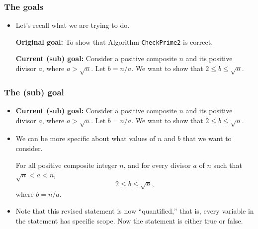 \begin{frame}\frametitle{The goals}
  \begin{itemize}
  \item Let's recall what we are trying to do.

    \begin{tcolorbox}
      {\bf Original goal:} To show that Algorithm {\tt CheckPrime2} is
      correct.
    \end{tcolorbox}
    
    \begin{tcolorbox}
      {\bf Current (sub) goal:} Consider a positive composite $n$ and
      its positive divisor $a$, where $a>\sqrt{n}$.  Let $b=n/a$.  We
      want to show that $2\leq b\leq\sqrt{n}$.
    \end{tcolorbox}
  \end{itemize}
\end{frame}

\begin{frame}\frametitle{The (sub) goal}
  \begin{itemize}
  \item
    {\small {\bf Current (sub) goal:} Consider a positive composite $n$ and its
    positive divisor $a$, where $a>\sqrt{n}$.  Let $b=n/a$.  We want
    to show that $2\leq b\leq\sqrt{n}$.}

  \item We can be more specific about what values of $n$ and $b$ that
    we want to consider. 

    \begin{tcolorbox}[title=Revised statement]
      For all positive composite integer $n$, and for every divisor
      $a$ of $n$ such that $\sqrt{n} < a < n$,
      \[ 2\leq b\leq\sqrt{n},\]
      where $b=n/a$.
    \end{tcolorbox}

  \item Note that this revised statement is now ``quantified,'' that
    is, every variable in the statement has specific scope.  Now the
    statement is either true or false.
  \end{itemize}
\end{frame}

